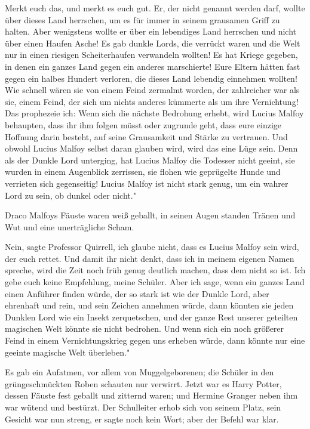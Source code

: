 \glqq{}Merkt euch das, und merkt es euch gut. Er, der nicht genannt werden darf,
wollte über dieses Land herrschen, um es für immer in seinem grausamen Griff zu
halten. Aber wenigstens wollte er über ein lebendiges Land herrschen und nicht
über einen Haufen Asche! Es gab dunkle Lords, die verrückt waren und die Welt
nur in einen riesigen Scheiterhaufen verwandeln wollten! Es hat Kriege gegeben,
in denen ein ganzes Land gegen ein anderes marschierte! Eure Eltern hätten fast
gegen ein halbes Hundert verloren, die dieses Land lebendig einnehmen wollten!
Wie schnell wären sie von einem Feind zermalmt worden, der zahlreicher war als
sie, einem Feind, der sich um nichts anderes kümmerte als um ihre Vernichtung!
Das prophezeie ich: Wenn sich die nächste Bedrohung erhebt, wird Lucius Malfoy
behaupten, dass ihr ihm folgen müsst oder zugrunde geht, dass eure einzige
Hoffnung darin besteht, auf seine Grausamkeit und Stärke zu vertrauen. Und
obwohl Lucius Malfoy selbst daran glauben wird, wird das eine Lüge sein. Denn
als der Dunkle Lord unterging, hat Lucius Malfoy die Todesser nicht geeint, sie
wurden in einem Augenblick zerrissen, sie flohen wie geprügelte Hunde und
verrieten sich gegenseitig! Lucius Malfoy ist nicht stark genug, um ein wahrer
Lord zu sein, ob dunkel oder nicht."

Draco Malfoys Fäuste waren weiß geballt, in seinen Augen standen Tränen und Wut
und eine unerträgliche Scham.

\glqq{}Nein\grqq{}, sagte Professor Quirrell, \glqq{}ich glaube nicht, dass es
Lucius Malfoy sein wird, der euch rettet. Und damit ihr nicht denkt, dass ich in
meinem eigenen Namen spreche, wird die Zeit noch früh genug deutlich machen,
dass dem nicht so ist. Ich gebe euch keine Empfehlung, meine Schüler. Aber ich
sage, wenn ein ganzes Land einen Anführer finden würde, der so stark ist wie der
Dunkle Lord, aber ehrenhaft und rein, und sein Zeichen annehmen würde, dann
könnten sie jeden Dunklen Lord wie ein Insekt zerquetschen, und der ganze Rest
unserer geteilten magischen Welt könnte sie nicht bedrohen. Und wenn sich ein
noch größerer Feind in einem Vernichtungskrieg gegen uns erheben würde, dann
könnte nur eine geeinte magische Welt überleben."

Es gab ein Aufatmen, vor allem von Muggelgeborenen; die Schüler in den
grüngeschmückten Roben schauten nur verwirrt. Jetzt war es Harry Potter, dessen
Fäuste fest geballt und zitternd waren; und Hermine Granger neben ihm war wütend
und bestürzt. Der Schulleiter erhob sich von seinem Platz, sein Gesicht war nun
streng, er sagte noch kein Wort; aber der Befehl war klar.


